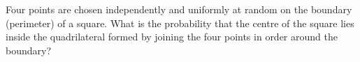 Four points are chosen independently and uniformly at random on the boundary (perimeter) of a square. What is the probability that the centre of the square lies inside the quadrilateral formed by joining the four points in order around the boundary?
